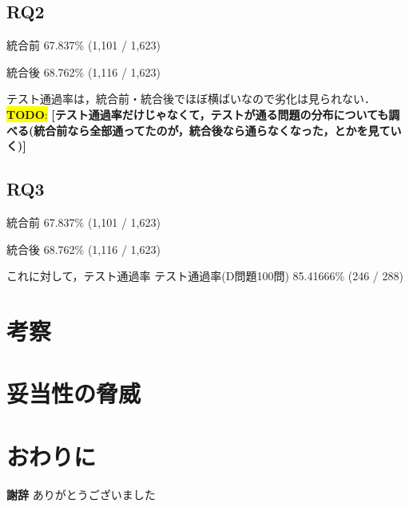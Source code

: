 \documentclass[submit,techrep,noauthor]{ipsj}
\newcommand{\todo}[1]{\colorbox{yellow}{{\bf TODO}:}{\color{red} {\textbf{[#1]}}}}
\begin{document}
\subsection{RQ2}
統合前
67.837\% (1,101 / 1,623)

統合後
68.762\% (1,116 / 1,623)

テスト通過率は，統合前・統合後でほぼ横ばいなので劣化は見られない．
\todo{テスト通過率だけじゃなくて，テストが通る問題の分布についても調べる(統合前なら全部通ってたのが，統合後なら通らなくなった，とかを見ていく)}

\subsection{RQ3}
統合前
67.837\% (1,101 / 1,623)

統合後
68.762\% (1,116 / 1,623)

これに対して，テスト通過率
テスト通過率(D問題100問)
85.41666\% (246 / 288)

\section{考察}

\section{妥当性の脅威}

\section{おわりに}
\textbf{謝辞} ありがとうございました
\end{document}
